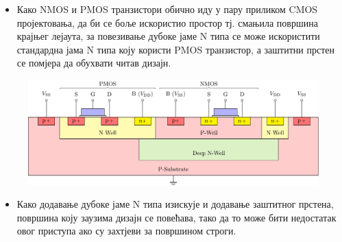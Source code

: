 \documentclass[aspectratio=169]{beamer}
\begin{document}
\begin{frame}{\secname}
	\small
	\begin{itemize}
		\item Како NMOS и PMOS транзистори обично иду у пару приликом CMOS пројектовања, да би се боље искористио простор тј. смањила површина крајњег лејаута, за повезивање дубоке јаме N типа се може искористити стандардна јама N типа коју користи PMOS транзистор, а заштитни прстен се помјера да обухвати читав дизајн.
	\end{itemize}
	\vspace{-0.3cm}
        \begin{figure}[!t]
        	\centering
            	\includegraphics[scale=0.6]{slike/prezentacija/dnw3.pdf}
        \end{figure}
	\vspace{-0.3cm}
	\begin{itemize}
		\item Како додавање дубоке јаме N типа изискује и додавање заштитног прстена, површина коју заузима дизајн се повећава, тако да то може бити недостатак овог приступа ако су захтјеви за површином строги.
	\end{itemize}
\end{frame}
\end{document}
